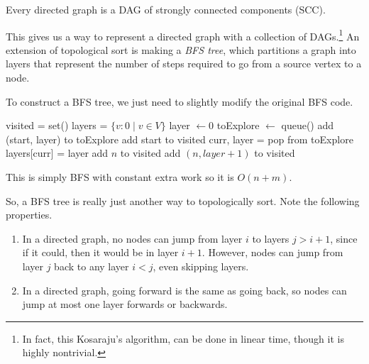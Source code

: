   \begin{theorem}
    Every directed graph is a DAG of strongly connected components (SCC). 
  \end{theorem}

  This gives us a way to represent a directed graph with a collection of DAGs.\footnote{In fact, this Kosaraju's algorithm, can be done in linear time, though it is highly nontrivial.} An extension of topological sort is making a \textit{BFS tree}, which partitions a graph into layers that represent the number of steps required to go from a source vertex to a node. 

  \begin{algo}
    To construct a BFS tree, we just need to slightly modify the original BFS code.
    \begin{algorithm}[H]
      \label{alg:bfs_tree}
      \begin{algorithmic}[1]
        \State visited = set() 
        \State layers = $\{v : 0 \mid v \in V \}$
          \State layer $\gets 0$ 
          \State toExplore $\gets$ queue() 
          \State add (start, layer) to toExplore 
          \State add start to visited
            \State curr, layer = pop from toExplore 
            \State layers[curr] = layer 
                \State add $n$ to visited 
                \State add $(n, layer+1)$ to visited 
              \EndIf
            \EndFor
          \EndWhile 
        \EndFunction
      \end{algorithmic}
    \end{algorithm}
    This is simply BFS with constant extra work so it is $O(n + m)$. 
  \end{algo}

  So, a BFS tree is really just another way to topologically sort. Note the following properties. 
  \begin{enumerate}
    \item In a directed graph, no nodes can jump from layer $i$ to layers $j > i+1$, since if it could, then it would be in layer $i+1$. However, nodes can jump from layer $j$ back to any layer $i < j$, even skipping layers. 
    \item In a directed graph, going forward is the same as going back, so nodes can jump at most one layer forwards or backwards. 
  \end{enumerate}

